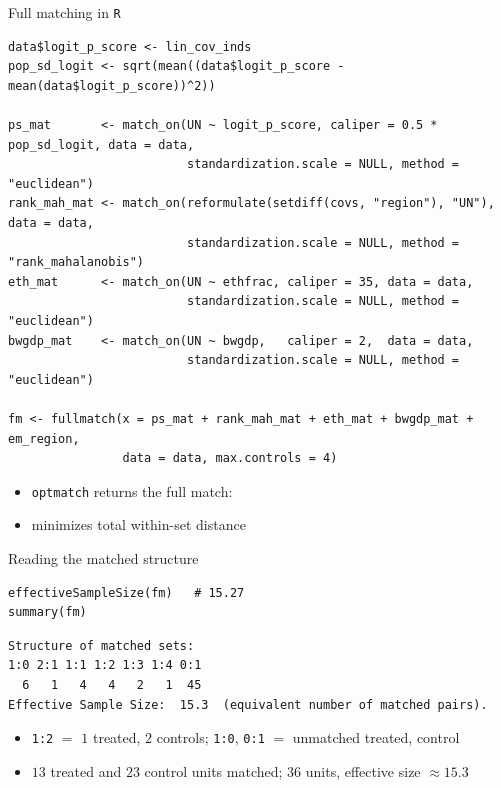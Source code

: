 \documentclass[table, xcolor = {dvipsnames}, 9pt]{beamer}
\theoremstyle{plain}
\newcommand{\mh}[1]{{\color{magenta}{#1}}}
\begin{document}
\begin{frame}[fragile]{Full matching in \texttt{R}}
\begin{lstlisting}[style=Rstyle, basicstyle=\ttfamily\tiny, frame=single]
data$logit_p_score <- lin_cov_inds
pop_sd_logit <- sqrt(mean((data$logit_p_score - mean(data$logit_p_score))^2))

ps_mat       <- match_on(UN ~ logit_p_score, caliper = 0.5 * pop_sd_logit, data = data,
                         standardization.scale = NULL, method = "euclidean")
rank_mah_mat <- match_on(reformulate(setdiff(covs, "region"), "UN"), data = data,
                         standardization.scale = NULL, method = "rank_mahalanobis")
eth_mat      <- match_on(UN ~ ethfrac, caliper = 35, data = data,
                         standardization.scale = NULL, method = "euclidean")
bwgdp_mat    <- match_on(UN ~ bwgdp,   caliper = 2,  data = data,
                         standardization.scale = NULL, method = "euclidean")

fm <- fullmatch(x = ps_mat + rank_mah_mat + eth_mat + bwgdp_mat + em_region,
                data = data, max.controls = 4)
\end{lstlisting}
\begin{itemize}
\item \texttt{optmatch} returns the \mh{optimal} full match: \vfill
\item[] minimizes total within-set distance \vfill
\end{itemize}
\end{frame}
\begin{frame}[fragile]{Reading the matched structure}
\begin{lstlisting}[style=Rstyle, basicstyle=\ttfamily\scriptsize, frame=single]
effectiveSampleSize(fm)   # 15.27
summary(fm)
\end{lstlisting}
\footnotesize
\begin{verbatim}
Structure of matched sets:
1:0 2:1 1:1 1:2 1:3 1:4 0:1
  6   1   4   4   2   1  45
Effective Sample Size:  15.3  (equivalent number of matched pairs).
\end{verbatim}
\normalsize
\begin{itemize} \vfill
\item \texttt{1:2} $=$ $1$ treated, $2$ controls; \texttt{1:0}, \texttt{0:1} $=$ unmatched treated, control \vfill
\item $13$ treated and $23$ control units matched; $36$ units, effective size $\approx 15.3$ \vfill
\end{itemize}
\end{frame}
\end{document}
